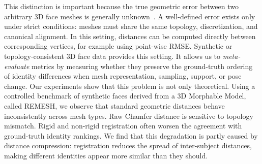 \documentclass{article}
\begin{document}
This distinction is important because the true geometric error between two arbitrary 3D face meshes is generally unknown~\cite{10448898}. A well-defined error exists only under strict conditions: meshes must share the same topology, discretization, and canonical alignment. In this setting, distances can be computed directly between corresponding vertices, for example using point-wise RMSE. Synthetic or topology-consistent 3D face data provides this setting. It allows us to \emph{meta-evaluate} metrics by measuring whether they preserve the ground-truth ordering of identity differences when mesh representation, sampling, support, or pose change. Our experiments show that this problem is not only theoretical. Using a controlled benchmark of synthetic faces derived from a 3D Morphable Model, called REMESH, we observe that standard geometric distances behave inconsistently across mesh types. Raw Chamfer distance is sensitive to topology mismatch. Rigid and non-rigid registration often worsen the agreement with ground-truth identity rankings. We find that this degradation is partly caused by distance compression: registration reduces the spread of inter-subject distances, making different identities appear more similar than they should.
\end{document}
